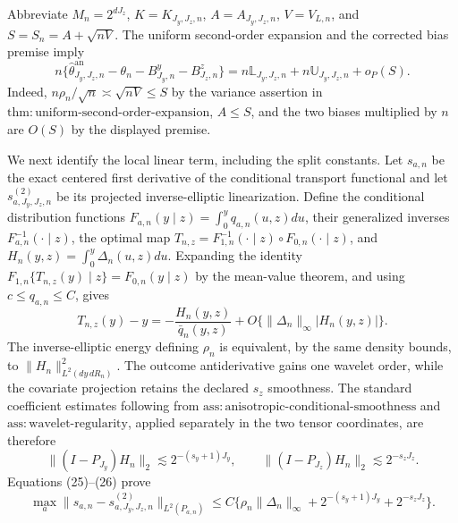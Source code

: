 Abbreviate \(M_n=2^{dJ_z}\), \(K=K_{J_y,J_z,n}\), \(A=A_{J_y,J_z,n}\), \(V=V_{L,n}\), and \(S=S_n=A+\sqrt{nV}\).  The uniform second-order expansion and the corrected bias premise imply
\[
n\{\widehat\theta^{\mathrm{an}}_{J_y,J_z,n}-\theta_n-B^y_{J_y,n}-B^z_{J_z,n}\}
=n\mathbb L_{J_y,J_z,n}+n\mathbb U_{J_y,J_z,n}+o_P(S).
\tag{24}
\]
Indeed, \(n\rho_n/\sqrt n\asymp\sqrt{nV}\le S\) by the variance assertion in \(\mathrm{thm{:}uniform\text{-}second\text{-}order\text{-}expansion}\), \(A\le S\), and the two biases multiplied by \(n\) are \(O(S)\) by the displayed premise.

We next identify the local linear term, including the split constants.  Let \(s_{a,n}\) be the exact centered first derivative of the conditional transport functional and let \(s^{(2)}_{a,J_y,J_z,n}\) be its projected inverse-elliptic linearization.  Define the conditional distribution functions \(F_{a,n}(y\mid z)=\int_0^yq_{a,n}(u,z)du\), their generalized inverses \(F_{a,n}^{-1}(\cdot\mid z)\), the optimal map \(T_{n,z}=F_{1,n}^{-1}(\cdot\mid z)\circ F_{0,n}(\cdot\mid z)\), and \(H_n(y,z)=\int_0^y\Delta_n(u,z)du\).  Expanding the identity \(F_{1,n}\{T_{n,z}(y)\mid z\}=F_{0,n}(y\mid z)\) by the mean-value theorem, and using \(c\le q_{a,n}\le C\), gives
\[
T_{n,z}(y)-y
=-\frac{H_n(y,z)}{\bar q_n(y,z)}
+O\{\|\Delta_n\|_\infty |H_n(y,z)|\}.
\tag{25}
\]
The inverse-elliptic energy defining \(\rho_n\) is equivalent, by the same density bounds, to \(\|H_n\|_{L^2(dy\,dR_n)}^2\).  The outcome antiderivative gains one wavelet order, while the covariate projection retains the declared \(s_z\) smoothness.  The standard coefficient estimates following from \(\mathrm{ass{:}anisotropic\text{-}conditional\text{-}smoothness}\) and \(\mathrm{ass{:}wavelet\text{-}regularity}\), applied separately in the two tensor coordinates, are therefore
\[
\|(I-P_{J_y})H_n\|_2\lesssim2^{-(s_y+1)J_y},
\qquad
\|(I-P_{J_z})H_n\|_2\lesssim2^{-s_zJ_z}.
\tag{26}
\]
Equations (25)--(26) prove
\[
\max_a\|s_{a,n}-s^{(2)}_{a,J_y,J_z,n}\|_{L^2(P_{a,n})}
\le C\{\rho_n\|\Delta_n\|_\infty+2^{-(s_y+1)J_y}+2^{-s_zJ_z}\}.
\tag{27}
\]

